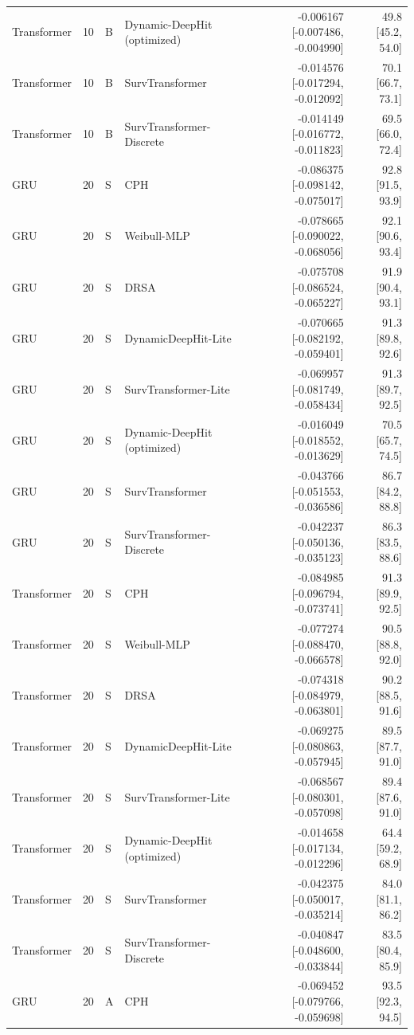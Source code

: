 \begin{longtable}{lll p{3.0cm} rr}
Transformer & 10 & B & Dynamic-DeepHit (optimized) & -0.006167 [-0.007486, -0.004990] & 49.8 [45.2, 54.0]\\
Transformer & 10 & B & SurvTransformer & -0.014576 [-0.017294, -0.012092] & 70.1 [66.7, 73.1]\\
Transformer & 10 & B & SurvTransformer-Discrete & -0.014149 [-0.016772, -0.011823] & 69.5 [66.0, 72.4]\\
GRU & 20 & S & CPH & -0.086375 [-0.098142, -0.075017] & 92.8 [91.5, 93.9]\\
GRU & 20 & S & Weibull-MLP & -0.078665 [-0.090022, -0.068056] & 92.1 [90.6, 93.4]\\
GRU & 20 & S & DRSA & -0.075708 [-0.086524, -0.065227] & 91.9 [90.4, 93.1]\\
GRU & 20 & S & DynamicDeepHit-Lite & -0.070665 [-0.082192, -0.059401] & 91.3 [89.8, 92.6]\\
GRU & 20 & S & SurvTransformer-Lite & -0.069957 [-0.081749, -0.058434] & 91.3 [89.7, 92.5]\\
GRU & 20 & S & Dynamic-DeepHit (optimized) & -0.016049 [-0.018552, -0.013629] & 70.5 [65.7, 74.5]\\
GRU & 20 & S & SurvTransformer & -0.043766 [-0.051553, -0.036586] & 86.7 [84.2, 88.8]\\
GRU & 20 & S & SurvTransformer-Discrete & -0.042237 [-0.050136, -0.035123] & 86.3 [83.5, 88.6]\\
Transformer & 20 & S & CPH & -0.084985 [-0.096794, -0.073741] & 91.3 [89.9, 92.5]\\
Transformer & 20 & S & Weibull-MLP & -0.077274 [-0.088470, -0.066578] & 90.5 [88.8, 92.0]\\
Transformer & 20 & S & DRSA & -0.074318 [-0.084979, -0.063801] & 90.2 [88.5, 91.6]\\
Transformer & 20 & S & DynamicDeepHit-Lite & -0.069275 [-0.080863, -0.057945] & 89.5 [87.7, 91.0]\\
Transformer & 20 & S & SurvTransformer-Lite & -0.068567 [-0.080301, -0.057098] & 89.4 [87.6, 91.0]\\
Transformer & 20 & S & Dynamic-DeepHit (optimized) & -0.014658 [-0.017134, -0.012296] & 64.4 [59.2, 68.9]\\
Transformer & 20 & S & SurvTransformer & -0.042375 [-0.050017, -0.035214] & 84.0 [81.1, 86.2]\\
Transformer & 20 & S & SurvTransformer-Discrete & -0.040847 [-0.048600, -0.033844] & 83.5 [80.4, 85.9]\\
GRU & 20 & A & CPH & -0.069452 [-0.079766, -0.059698] & 93.5 [92.3, 94.5]\\

\end{longtable}
